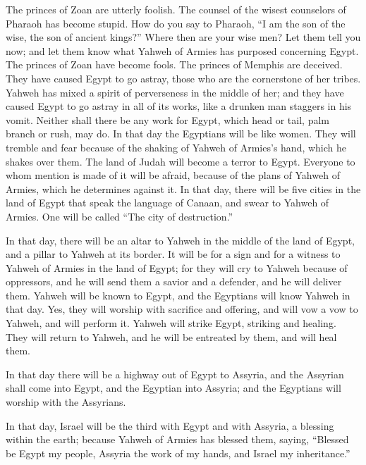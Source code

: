  The princes of Zoan are utterly foolish. The counsel of
the wisest counselors of Pharaoh has become stupid. How do you say to
Pharaoh, ``I am the son of the wise, the son of ancient kings?''
 Where then are your wise men? Let them tell you now; and
let them know what Yahweh of Armies has purposed concerning Egypt.
 The princes of Zoan have become fools. The princes of
Memphis are deceived. They have caused Egypt to go astray, those who are
the cornerstone of her tribes.  Yahweh has mixed a spirit
of perverseness in the middle of her; and they have caused Egypt to go
astray in all of its works, like a drunken man staggers in his vomit.
 Neither shall there be any work for Egypt, which head or
tail, palm branch or rush, may do.  In that day the
Egyptians will be like women. They will tremble and fear because of the
shaking of Yahweh of Armies's hand, which he shakes over them.
 The land of Judah will become a terror to Egypt.
Everyone to whom mention is made of it will be afraid, because of the
plans of Yahweh of Armies, which he determines against it.
 In that day, there will be five cities in the land of
Egypt that speak the language of Canaan, and swear to Yahweh of Armies.
One will be called ``The city of destruction.''

 In that day, there will be an altar to Yahweh in the
middle of the land of Egypt, and a pillar to Yahweh at its border.
 It will be for a sign and for a witness to Yahweh of
Armies in the land of Egypt; for they will cry to Yahweh because of
oppressors, and he will send them a savior and a defender, and he will
deliver them.  Yahweh will be known to Egypt, and the
Egyptians will know Yahweh in that day. Yes, they will worship with
sacrifice and offering, and will vow a vow to Yahweh, and will perform
it.  Yahweh will strike Egypt, striking and healing. They
will return to Yahweh, and he will be entreated by them, and will heal
them.

 In that day there will be a highway out of Egypt to
Assyria, and the Assyrian shall come into Egypt, and the Egyptian into
Assyria; and the Egyptians will worship with the Assyrians.

 In that day, Israel will be the third with Egypt and
with Assyria, a blessing within the earth;  because
Yahweh of Armies has blessed them, saying, ``Blessed be Egypt my people,
Assyria the work of my hands, and Israel my inheritance.''

